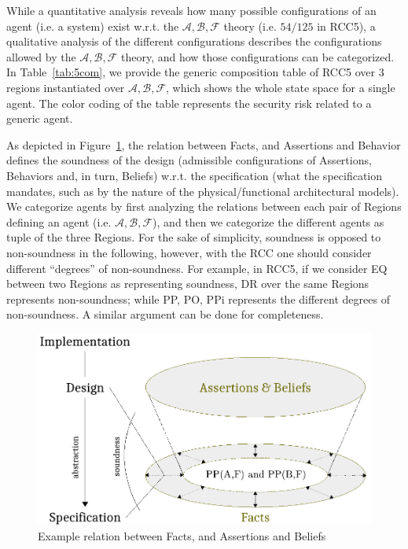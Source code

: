 \documentclass[conference]{IEEEtran}
\newcommand{\assertionRegion}{\mathcal{A}}
\newcommand{\beliefRegion}{\mathcal{B}}
\newcommand{\factRegion}{\mathcal{F}}
\newcommand{\abf}{\assertionRegion,\beliefRegion,\factRegion}
\begin{document}
While a quantitative analysis reveals how many possible configurations of an
agent (i.e. a system) exist w.r.t. the $\abf$ theory (i.e. $54/125$ in RCC5), a
qualitative analysis of the different configurations describes the
configurations allowed by the $\abf$ theory, and how those configurations can
be categorized.  In Table~\ref{tab:5com}, we provide the generic composition
table of RCC5 over 3 regions instantiated over $\abf$, which shows the whole
state space for a single agent. The color coding of the table represents the
security risk related to a generic agent. 

As depicted in Figure~\ref{fig:soundness}, the relation between Facts, and
Assertions and Behavior defines the soundness of the design (admissible
configurations of Assertions, Behaviors and, in turn, Beliefs) w.r.t. the
specification (what the specification mandates, such as by the nature of the
physical/functional architectural models). We categorize agents by first
analyzing the relations between each pair of Regions defining an agent (i.e.
$\abf$), and then we categorize the different agents as tuple of the three
Regions.  For the sake of simplicity, soundness is opposed to non-soundness in
the following, however, with the RCC one should consider different ``degrees''
of non-soundness. For example, in RCC5, if we consider EQ between two Regions
as representing soundness, DR over the same Regions represents non-soundness;
while PP, PO, PPi represents the different degrees of non-soundness.  A similar
argument can be done for completeness.  
\begin{figure}[t]
	\centering
	\includegraphics[width=.9\columnwidth]{soundness.pdf}
	\caption{Example relation between Facts, and Assertions and Beliefs}
	\label{fig:soundness}
\end{figure}
\end{document}
